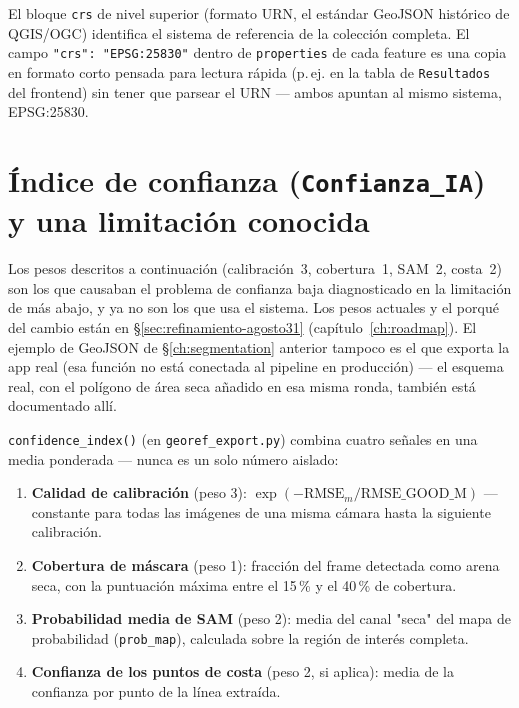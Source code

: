 \begin{infobox}
El bloque \texttt{crs} de nivel superior (formato URN, el estándar GeoJSON histórico de
QGIS/OGC) identifica el sistema de referencia de la colección completa. El campo
\texttt{"crs": "EPSG:25830"} dentro de \texttt{properties} de cada feature es una copia en
formato corto pensada para lectura rápida (p.\,ej. en la tabla de \texttt{Resultados} del
frontend) sin tener que parsear el URN — ambos apuntan al mismo sistema, EPSG:25830.
\end{infobox}

\section{Índice de confianza (\texttt{Confianza\_IA}) y una limitación conocida}
\label{sec:confidence-index-limitation}

\begin{warnbox}
Los pesos descritos a continuación (calibración~3, cobertura~1, SAM~2, costa~2) son los que
causaban el problema de confianza baja diagnosticado en la limitación de más abajo, y ya no son
los que usa el sistema. Los pesos actuales y el porqué del cambio están en
\S\ref{sec:refinamiento-agosto31} (capítulo~\ref{ch:roadmap}). El ejemplo de GeoJSON de
\S\ref{ch:segmentation} anterior tampoco es el que exporta la app real (esa función no está
conectada al pipeline en producción) — el esquema real, con el polígono de área seca añadido en
esa misma ronda, también está documentado allí.
\end{warnbox}

\texttt{confidence\_index()} (en \texttt{georef\_export.py}) combina cuatro señales en una
media ponderada — nunca es un solo número aislado:

\begin{enumerate}[leftmargin=1.5em]
  \item \textbf{Calidad de calibración} (peso 3): $\exp(-\text{RMSE}_m / \text{RMSE\_GOOD\_M})$
        — constante para todas las imágenes de una misma cámara hasta la siguiente calibración.
  \item \textbf{Cobertura de máscara} (peso 1): fracción del frame detectada como arena seca,
        con la puntuación máxima entre el 15\,\% y el 40\,\% de cobertura.
  \item \textbf{Probabilidad media de SAM} (peso 2): media del canal "seca" del mapa de
        probabilidad (\texttt{prob\_map}), calculada sobre la región de interés completa.
  \item \textbf{Confianza de los puntos de costa} (peso 2, si aplica): media de la confianza
        por punto de la línea extraída.
\end{enumerate}

